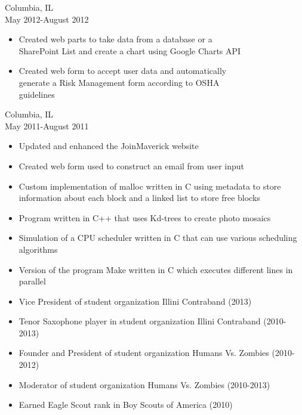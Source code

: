 \documentclass[11pt]{article}
\begin{document}
     \hfill Columbia, IL\\
     \hfill May 2012-August 2012
    \begin{itemize}[noitemsep,topsep=0pt,leftmargin=52pt]
      \item Created web parts to take data from a database or a\\
        SharePoint List and create a chart using Google Charts API
      \item Created web form to accept user data and automatically\\
        generate a Risk Management form according to OSHA\\
        guidelines
    \end{itemize}
    \medskip

     \hfill Columbia, IL\\
     \hfill May 2011-August 2011
    \begin{itemize}[noitemsep,topsep=0pt,leftmargin=52pt]
      \item Updated and enhanced the JoinMaverick website
      \item Created web form used to construct an email from user input
    \end{itemize}

  \bigskip

  \begin{itemize}[noitemsep,topsep=0pt]
    \item Custom implementation of malloc written in C using metadata to store information about each block and a linked list to store free blocks
    \item Program written in C++ that uses Kd-trees to create photo mosaics
    \item Simulation of a CPU scheduler written in C that can use various scheduling algorithms
    \item Version of the program Make written in C which executes different lines in parallel
  \end{itemize}

  \bigskip

  \begin{itemize}[noitemsep,topsep=0pt]
    \item Vice President of student organization Illini Contraband \hfill (2013)
    \item Tenor Saxophone player in student organization Illini Contraband \hfill (2010-2013)
    \item Founder and President of student organization Humans Vs. Zombies \hfill (2010-2012)
    \item Moderator of student organization Humans Vs. Zombies \hfill (2010-2013)
    \item Earned Eagle Scout rank in Boy Scouts of America \hfill (2010)
  \end{itemize}
\end{document}
